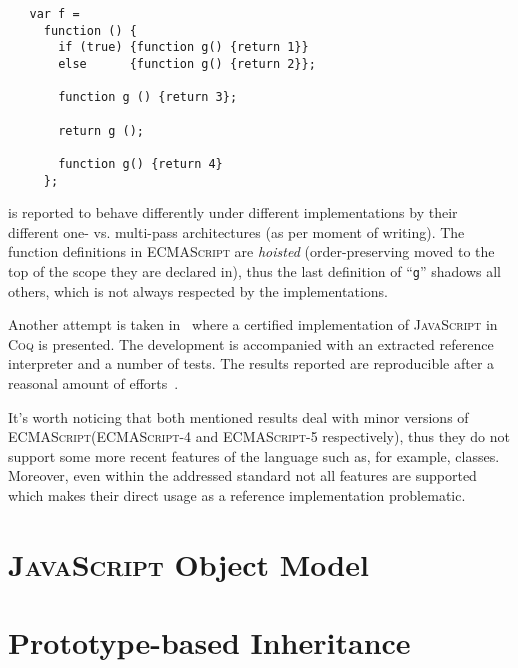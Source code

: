 \documentclass{article}
\newcommand{\js}{\textsc{JavaScript}\xspace}
\newcommand{\es}{\textsc{ECMAScript}\xspace}
\begin{document}
\begin{lstlisting}
   var f =
     function () {
       if (true) {function g() {return 1}}
       else      {function g() {return 2}};
       
       function g () {return 3};
    
       return g ();
    
       function g() {return 4}
     };
\end{lstlisting}

is reported to behave differently under different implementations by their different one- vs. multi-pass
architectures (as per moment of writing). The function definitions in \es are \emph{hoisted} (order-preserving
moved to the top of the scope they are declared in), thus the last definition of ``\lstinline|g|'' shadows
all others, which is not always respected by the implementations.

Another attempt is taken in~\cite{Trusted,JSCert} where a certified implementation of \js in \textsc{Coq} is
presented. The development is accompanied with an extracted reference interpreter and a number of tests. The
results reported are reproducible after a reasonal amount of efforts~\cite{JSCert-lozov}.

It's worth noticing that both mentioned results deal with minor versions of \es (\es-4 and \es-5 respectively), thus
they do not support some more recent features of the language such as, for example, classes. Moreover, even
within the addressed standard not all features are supported which makes their direct usage as a reference
implementation problematic.

\section{\js Object Model}

\section{Prototype-based Inheritance}
\end{document}
